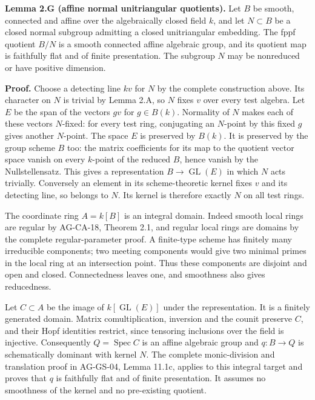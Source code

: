 \documentclass[11pt,a4paper,openany]{report}
\begin{document}
\textbf{Lemma 2.G (affine normal unitriangular quotients).} Let \(B\) be smooth, connected and affine over the algebraically closed field \(k\), and let \(N\subset B\) be a closed normal subgroup admitting a closed unitriangular embedding. The fppf quotient \(B/N\) is a smooth connected affine algebraic group, and its quotient map is faithfully flat and of finite presentation. The subgroup \(N\) may be nonreduced or have positive dimension.

\textbf{Proof.} Choose a detecting line \(kv\) for \(N\) by the complete construction above. Its character on \(N\) is trivial by Lemma 2.A, so \(N\) fixes \(v\) over every test algebra. Let \(E\) be the span of the vectors \(gv\) for \(g\in B(k)\). Normality of \(N\) makes each of these vectors \(N\)-fixed: for every test ring, conjugating an \(N\)-point by this fixed \(g\) gives another \(N\)-point. The space \(E\) is preserved by \(B(k)\). It is preserved by the group scheme \(B\) too: the matrix coefficients for its map to the quotient vector space vanish on every \(k\)-point of the reduced \(B\), hence vanish by the Nullstellensatz. This gives a representation \(B\to\operatorname{GL}(E)\) in which \(N\) acts trivially. Conversely an element in its scheme-theoretic kernel fixes \(v\) and its detecting line, so belongs to \(N\). Its kernel is therefore exactly \(N\) on all test rings.

The coordinate ring \(A=k[B]\) is an integral domain. Indeed smooth local rings are regular by AG-CA-18, Theorem 2.1, and regular local rings are domains by the complete regular-parameter proof. A finite-type scheme has finitely many irreducible components; two meeting components would give two minimal primes in the local ring at an intersection point. Thus these components are disjoint and open and closed. Connectedness leaves one, and smoothness also gives reducedness.

Let \(C\subset A\) be the image of \(k[\operatorname{GL}(E)]\) under the representation. It is a finitely generated domain. Matrix comultiplication, inversion and the counit preserve \(C\), and their Hopf identities restrict, since tensoring inclusions over the field is injective. Consequently \(Q=\operatorname{Spec}C\) is an affine algebraic group and \(q:B\to Q\) is schematically dominant with kernel \(N\). The complete monic-division and translation proof in AG-GS-04, Lemma 11.1c, applies to this integral target and proves that \(q\) is faithfully flat and of finite presentation. It assumes no smoothness of the kernel and no pre-existing quotient.
\end{document}
